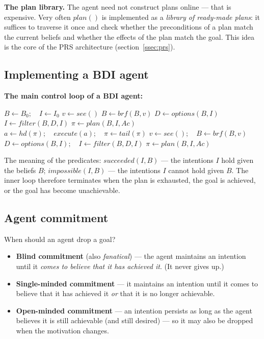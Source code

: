 \documentclass[11pt,a4paper]{article}
\theoremstyle{definition}
\begin{document}
\textbf{The plan library.} The agent need not construct plans online --- that is expensive. Very
often $\mathit{plan}()$ is implemented as a \emph{library of ready-made plans}: it suffices to
traverse it once and check whether the preconditions of a plan match the current beliefs and
whether the effects of the plan match the goal. This idea is the core of the PRS architecture
(section~\ref{ssec:prs}).

\subsection{Implementing a BDI agent}

\noindent\textbf{The main control loop of a BDI agent:}
\begin{algorithmic}[1]
\State $B \gets B_0;\quad I \gets I_0$
  \State $v \gets \mathit{see}()$
  \State $B \gets \mathit{brf}(B,v)$
  \State $D \gets \mathit{options}(B,I)$
  \State $I \gets \mathit{filter}(B,D,I)$
  \State $\pi \gets \mathit{plan}(B,I,\mathit{Ac})$
    \State $a \gets \mathit{hd}(\pi);\quad \mathit{execute}(a);\quad \pi \gets \mathit{tail}(\pi)$
    \State $v \gets \mathit{see}();\quad B \gets \mathit{brf}(B,v)$
      \State $D \gets \mathit{options}(B,I);\quad I \gets \mathit{filter}(B,D,I)$
    \EndIf
      \State $\pi \gets \mathit{plan}(B,I,\mathit{Ac})$ 
    \EndIf
  \EndWhile
\EndWhile
\end{algorithmic}

The meaning of the predicates: $\mathit{succeeded}(I,B)$ --- the intentions $I$ hold given the
beliefs $B$; $\mathit{impossible}(I,B)$ --- the intentions $I$ cannot hold given $B$.
The inner loop therefore terminates when the plan is exhausted, the goal is achieved, or the goal
has become unachievable.

\subsection{Agent commitment}
\label{ssec:commitment}

\begin{defbox}
When should an agent drop a goal?
\begin{itemize}
\item \textbf{Blind commitment} (also \emph{fanatical}) --- the agent maintains an intention until
  it \emph{comes to believe that it has achieved it}. (It never gives up.)
\item \textbf{Single-minded commitment} --- it maintains an intention until it comes to believe
  that it has achieved it \emph{or} that it is no longer achievable.
\item \textbf{Open-minded commitment} --- an intention persists as long as the agent believes it is
  still achievable (and still desired) --- so it may also be dropped when the motivation changes.
\end{itemize}
\end{defbox}
\end{document}
